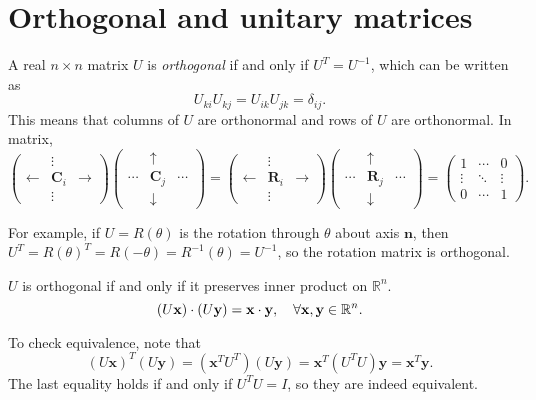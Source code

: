 \documentclass[10pt]{article}
\begin{document}
    \section{Orthogonal and unitary matrices}
    \begin{definition}
        A real $ n\times n $ matrix $U$ is \textit{orthogonal} if and only if $ U^T=U^{-1} $, which can be written as 
        \[
            U_{ki}U_{kj}=U_{ik}U_{jk}=\delta_{ij}
        .\]
        This means that columns of $U$ are orthonormal and rows of $U$ are orthonormal. In matrix,
        \[
            \begin{pmatrix}
                &\vdots&\\
                \leftarrow & \mathbf{C}_i& \rightarrow \\
                &\vdots&
            \end{pmatrix}
            \begin{pmatrix}
                &\uparrow&\\
                \cdots&\mathbf{C}_j&\cdots\\
                &\downarrow &
            \end{pmatrix}
            =
            \begin{pmatrix}
                &\vdots&\\
                \leftarrow & \mathbf{R}_i& \rightarrow \\
                &\vdots&
            \end{pmatrix}
            \begin{pmatrix}
                &\uparrow&\\
                \cdots&\mathbf{R}_j&\cdots\\
                &\downarrow &
            \end{pmatrix}
            =
            \begin{pmatrix}
                1&\cdots&0\\
                \vdots&\ddots &\vdots \\
                0&\cdots &1
            \end{pmatrix}
        .\]
    \end{definition}
    For example, if $U=R(\theta)$ is the rotation through $ \theta $ about axis $\mathbf{n}$, then $ U^T=R(\theta)^T=R(-\theta)=R^{-1}(\theta)=U^{-1} $, so the rotation matrix is orthogonal.

    \begin{definition}
        $U$ is orthogonal if and only if it preserves inner product on $ \mathbb{R}^{n} $.
        \[
            (U \mathbf{x})\cdot (U \mathbf{y})=\mathbf{x}\cdot \mathbf{y}, \quad \forall {\bf x},{\bf y}\in \mathbb{R}^{n}
        .\]
    \end{definition}
    To check equivalence, note that 
    \[
        (U \mathbf{x})^T(U \mathbf{y})=(\mathbf{x}^T U^T)(U \mathbf{y})=\mathbf{x}^T(U^TU)\mathbf{y}=\mathbf{x}^T \mathbf{y}
    .\]
    The last equality holds if and only if $ U^TU=I $, so they are indeed equivalent.
\end{document}
